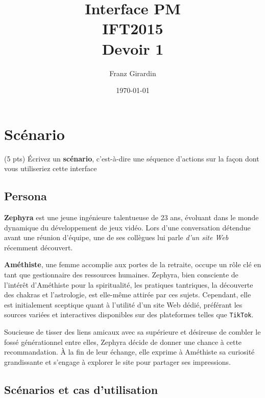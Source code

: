 \documentclass[9pt]{report}
\title{\Huge{Interface PM }\\{IFT2015}\\{\textbf{Devoir 1}}}
\author{\huge{Franz Girardin}}
\date{\today}
\begin{document}
\maketitle

\pagebreak
\tableofcontents
\pagebreak


\chapter{Scénario }
  \vspace{-2em}
\begin{multicols*}{2}
  \small
  \begin{Exercice}{(5 pts)}{}
    Écrivez un \textbf{scénario}, c’est-à-dire une séquence d’actions sur 
    la façon dont vous utiliseriez cette
    interface
  \end{Exercice}


  \section{Persona}
  \textbf{Zephyra} est une jeune ingénieure talentueuse de 23 ans, 
  évoluant dans le monde dynamique du développement de jeux vidéo. 
  Lors d'une conversation détendue avant une réunion d'équipe, 
une de ses collègues lui parle \textit{d'un site Web} récemment découvert.

  \textbf{Améthiste}, une femme accomplie aux portes de la retraite, 
  occupe un rôle clé en tant que gestionnaire des ressources humaines. 
  Zephyra, bien consciente de l'intérêt d'Améthiste pour la spiritualité, 
  les pratiques tantriques, la découverte des chakras et l'astrologie, 
  est elle-même attirée par ces sujets. Cependant, elle est initialement 
  sceptique quant à l'utilité d'un site Web dédié, préférant les sources 
  variées et interactives disponibles sur des plateformes telles que 
  \texttt{TikTok}.

  Soucieuse de tisser des liens amicaux avec sa supérieure et désireuse 
  de combler le fossé générationnel entre elles, Zephyra décide de donner 
  une chance à cette recommandation. À la fin de leur échange, elle exprime 
  à Améthiste sa curiosité grandissante et s'engage à explorer le site 
  pour partager ses impressions.


  \section{Scénarios et cas d'utilisation} 


\end{multicols*}
\end{document}
